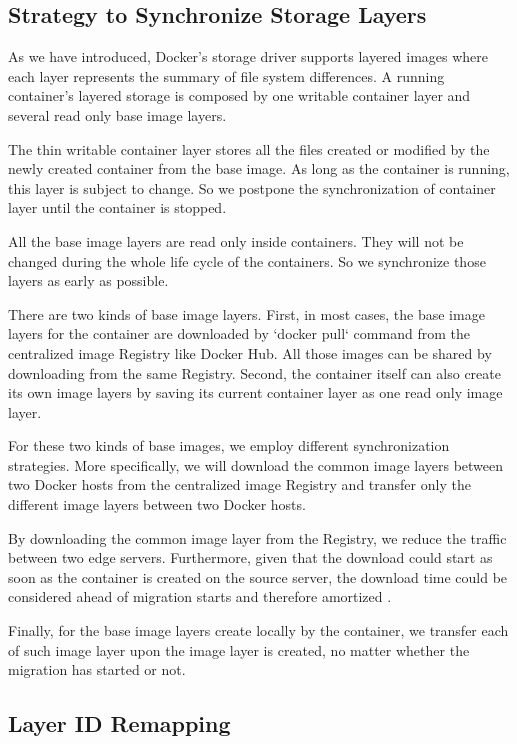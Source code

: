 \subsection{Strategy to Synchronize Storage Layers} \label{design:syncImage}

As we have introduced, Docker's storage driver supports layered images where each layer represents the summary of file system differences. A running container's layered storage is composed by one writable container layer and several read only base image layers. 

The thin writable container layer stores all the files created or modified by the newly created container from the base image. As long as the container is running, this layer is subject to change. So we postpone the synchronization of container layer until the container is stopped.

All the base image layers are read only inside containers. They will not be changed during the whole life cycle of the containers. So we synchronize those layers as early as possible.

There are two kinds of base image layers. First, in most cases, the base image layers for the container are downloaded by `docker pull` command from the centralized image Registry like Docker Hub. All those images can be shared by downloading from the same Registry. Second, the container itself can also create its own image layers by saving its current container layer as one read only image layer. 

For these two kinds of base images, we employ different synchronization strategies. More specifically, we will download the common image layers between two Docker hosts from the centralized image Registry and transfer only the different image layers between two Docker hosts.

By downloading the common image layer from the Registry, we reduce the traffic between two edge servers. Furthermore, given that the download could start as soon as the container is created on the source server, the download time could be considered ahead of migration starts and therefore amortized .

Finally, for the base image layers create locally by the container, we transfer each of such image layer upon the image layer is created, no matter whether the migration has started or not. 

\subsection{Layer ID Remapping} \label{design:idremapping}

